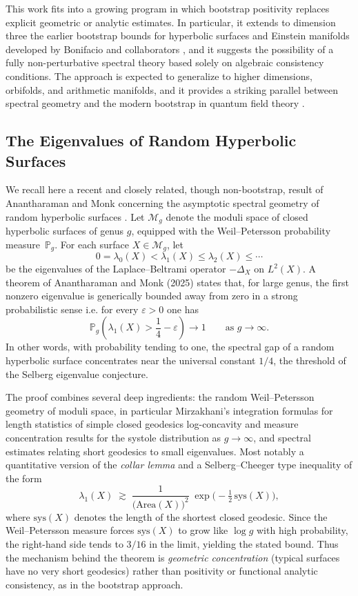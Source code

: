 \documentclass[11pt]{article}
\theoremstyle{plain}
\begin{document}
\medskip

This work fits into a growing program in which bootstrap positivity replaces
explicit geometric or analytic estimates.  In particular, it extends to
dimension three the earlier bootstrap bounds for hyperbolic surfaces and Einstein
manifolds developed by Bonifacio and collaborators \cite{Bon1,Bon2}, and it suggests the possibility of a
fully non-perturbative spectral theory based solely on algebraic consistency
conditions.  The approach is expected to generalize to higher dimensions,
orbifolds, and arithmetic manifolds, and it provides a striking parallel between
spectral geometry and the modern bootstrap in quantum field theory \cite{BPZ1984,RRTV,bootstraps,bootstraps berenstein,bootstraps Kazakov}.

\subsection{The Eigenvalues of Random Hyperbolic Surfaces}
We recall here a recent and closely related, though non-bootstrap, result of
Anantharaman and Monk concerning the asymptotic spectral geometry of random
hyperbolic surfaces \cite{AnMo}.  Let $\mathcal{M}_g$ denote the moduli space of closed
hyperbolic surfaces of genus $g$, equipped with the Weil--Petersson probability
measure~$\mathbb{P}_g$.  For each surface $X \in \mathcal{M}_g$, let
\[
0 = \lambda_0(X) < \lambda_1(X) \le \lambda_2(X) \le \cdots
\]
be the eigenvalues of the Laplace--Beltrami operator $-\Delta_X$ on $L^2(X)$.
A theorem of Anantharaman and Monk (2025) states that, for large genus, the first
nonzero eigenvalue is generically bounded away from zero in a strong probabilistic
sense i.e. for every $\varepsilon > 0$ one has
\[
\mathbb{P}_g\!\left( \lambda_1(X) > \frac{1}{4} - \varepsilon \right) \longrightarrow 1
\qquad\text{as } g \to \infty.
\]
In other words, with probability tending to one, the spectral gap of a random
hyperbolic surface concentrates near the universal constant $1/4$,
the  threshold of the Selberg eigenvalue conjecture.

\medskip

The proof combines several deep ingredients: the random Weil--Petersson
geometry of moduli space, in particular Mirzakhani's integration formulas for
length statistics of simple closed geodesics  log-concavity and measure
concentration results for the systole distribution as $g \to \infty$, and
spectral estimates relating short geodesics to small eigenvalues. Most notably a
quantitative version of the \emph{collar lemma} and a Selberg--Cheeger type
inequality of the form
\[
\lambda_1(X) \;\gtrsim\; \frac{1}{\bigl( \mathrm{Area}(X) \bigr)^2}
\;\exp\!\big( -\tfrac{1}{2}\,\mathrm{sys}(X) \big),
\]
where $\mathrm{sys}(X)$ denotes the length of the shortest closed geodesic.
Since the Weil--Petersson measure forces $\mathrm{sys}(X)$ to grow like
$\log g$ with high probability, the right-hand side tends to $3/16$ in the
limit, yielding the stated bound.  Thus the mechanism behind the theorem is
\emph{geometric concentration} (typical surfaces have no very short geodesics)
rather than positivity or functional analytic consistency, as in the bootstrap
approach.  
\end{document}
